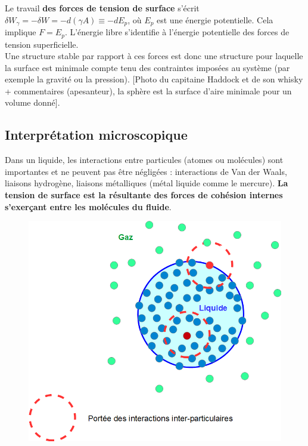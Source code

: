 \documentclass[11pt,a4paper]{report}
\begin{document}
Le travail \textbf{des forces de tension de surface} s'écrit $\delta W_\gamma = - \delta W = - d\left(\gamma A\right) \equiv - dE_p$, où $E_p$ est une énergie potentielle. Cela implique $F = E_p$. L'énergie libre s'identifie à l'énergie potentielle des forces de tension superficielle.\\

Une structure stable par rapport à ces forces est donc une structure pour laquelle la surface est minimale compte tenu des contraintes imposées au système (par exemple la gravité ou la pression). [Photo du capitaine Haddock et de son whisky + commentaires (apesanteur), la sphère est la surface d'aire minimale pour un volume donné].

\subsection{Interprétation microscopique}

Dans un liquide, les interactions entre particules (atomes ou molécules) sont importantes et ne peuvent pas être négligées : interactions de Van der Waals, liaisons hydrogène, liaisons métalliques (métal liquide comme le mercure). \textbf{La tension de surface est la résultante des forces de cohésion internes s'exerçant entre les molécules du fluide}.

\begin{figure}[h!]
\begin{center}
	\includegraphics[scale = 0.5]{tension_micro.png} 
	\label{fig:tension_micro}
\end{center}
\end{figure}
\end{document}
